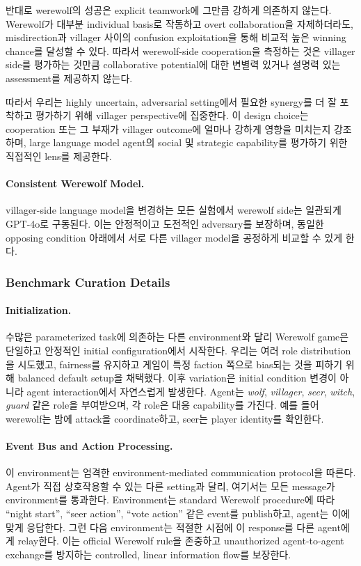 반대로 werewolf의 성공은 explicit teamwork에 그만큼 강하게 의존하지 않는다. Werewolf가 대부분 individual basis로 작동하고 overt collaboration을 자제하더라도, misdirection과 villager 사이의 confusion exploitation을 통해 비교적 높은 winning chance를 달성할 수 있다. 따라서 werewolf-side cooperation을 측정하는 것은 villager side를 평가하는 것만큼 collaborative potential에 대한 변별력 있거나 설명력 있는 assessment를 제공하지 않는다.

따라서 우리는 highly uncertain, adversarial setting에서 필요한 synergy를 더 잘 포착하고 평가하기 위해 villager perspective에 집중한다. 이 design choice는 cooperation 또는 그 부재가 villager outcome에 얼마나 강하게 영향을 미치는지 강조하며, large language model agent의 social 및 strategic capability를 평가하기 위한 직접적인 lens를 제공한다.

\paragraph{Consistent Werewolf Model.}
villager-side language model을 변경하는 모든 실험에서 werewolf side는 일관되게 GPT-4o로 구동된다. 이는 안정적이고 도전적인 adversary를 보장하며, 동일한 opposing condition 아래에서 서로 다른 villager model을 공정하게 비교할 수 있게 한다.
\subsubsection{Benchmark Curation Details}

\paragraph{Initialization.}
수많은 parameterized task에 의존하는 다른 environment와 달리 Werewolf game은 단일하고 안정적인 initial configuration에서 시작한다. 우리는 여러 role distribution을 시도했고, fairness를 유지하고 게임이 특정 faction 쪽으로 bias되는 것을 피하기 위해 balanced default setup을 채택했다. 이후 variation은 initial condition 변경이 아니라 agent interaction에서 자연스럽게 발생한다. Agent는 \emph{wolf}, \emph{villager}, \emph{seer}, \emph{witch}, \emph{guard} 같은 role을 부여받으며, 각 role은 대응 capability를 가진다. 예를 들어 werewolf는 밤에 attack을 coordinate하고, seer는 player identity를 확인한다.

\paragraph{Event Bus and Action Processing.}
이 environment는 엄격한 environment-mediated communication protocol을 따른다. Agent가 직접 상호작용할 수 있는 다른 setting과 달리, 여기서는 모든 message가 environment를 통과한다. Environment는 standard Werewolf procedure에 따라 ``night start'', ``seer action'', ``vote action'' 같은 event를 publish하고, agent는 이에 맞게 응답한다. 그런 다음 environment는 적절한 시점에 이 response를 다른 agent에게 relay한다. 이는 official Werewolf rule을 존중하고 unauthorized agent-to-agent exchange를 방지하는 controlled, linear information flow를 보장한다.

